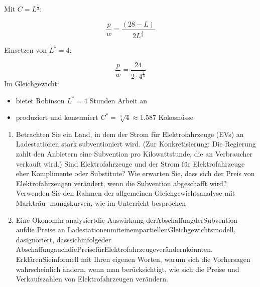 \begin{solution}
	Mit \( C = L^{\frac{1}{3}} \):

	\[
		\frac{p}{w} = \frac{(28 - L)}{2 L^{\frac{1}{3}}}
	\]

	Einsetzen von \( L^* = 4 \):

	\[
		\frac{p}{w} = \frac{24}{2 \cdot 4^{\frac{1}{3}}}
	\]
	Im Gleichgewicht:

	\begin{itemize}
		\item bietet Robinson \( L^* = 4 \) Stunden Arbeit an
		\item produziert und konsumiert \( C^* = \sqrt[3]{4} \approx 1.587 \) Kokosnüsse
	\end{itemize}

\end{solution}


\begin{question}
	\begin{enumerate}
		\item Betrachten Sie ein Land, in dem der Strom für Elektrofahrzeuge (EVs) an Ladestationen
		      stark subventioniert wird. (Zur Konkretisierung: Die Regierung zahlt den Anbietern eine
		      Subvention pro Kilowattstunde, die an Verbraucher verkauft wird.) Sind Elektrofahrzeuge
		      und der Strom für Elektrofahrzeuge eher Komplimente oder Substitute? Wie erwarten
		      Sie, dass sich der Preis von Elektrofahrzeugen verändert, wenn die Subvention abgeschafft
		      wird? Verwenden Sie den Rahmen der allgemeinen Gleichgewichtsanalyse mit Markträu-
		      mungskurven, wie im Unterricht besprochen
		\item Eine Ökonomin analysiertdie Auswirkung derAbschaffungderSubvention aufdie Preise an
		      LadestationenmiteinempartiellenGleichgewichtsmodell, dasignoriert, dasssichinfolgeder
		      AbschaffungauchdiePreisefürElektrofahrzeugeverändernkönnten. ErklärenSieinformell
		      mit Ihren eigenen Worten, warum sich die Vorhersagen wahrscheinlich ändern, wenn man
		      berücksichtigt, wie sich die Preise und Verkaufszahlen von Elektrofahrzeugen verändern.
	\end{enumerate}

\end{question}

